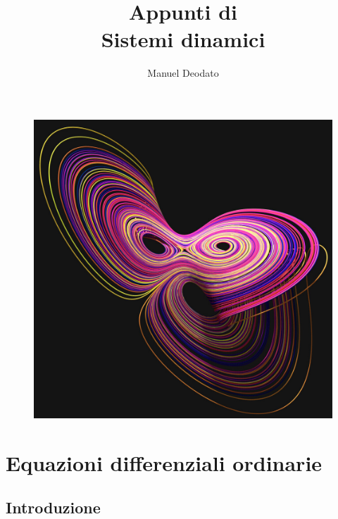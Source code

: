 \documentclass[12pt]{scrartcl}
\title{Appunti di\\ \vspace{.3cm} Sistemi dinamici}
\author{Manuel Deodato}
\date{}
\theoremstyle{style}
\renewcommand{\maketitle}{
\begin{center}
{\sffamily
{\fontsize{20}{20}\selectfont\MakeUppercase\thetitle}}

\vspace{0.2in}

{\large\scshape\theauthor}
\end{center}
}
\numberwithin{equation}{subsection}
\begin{document}
\pagestyle{plain}
\maketitle
\vspace{6cm}
\begin{figure}[h!]
	\centering
	\includegraphics[width=.6\columnwidth]{front.jpeg}
\end{figure}

\newpage
\pagestyle{plain}
\tableofcontents 
\newpage
\pagestyle{fancy}
\section{Equazioni differenziali ordinarie}
\subsection{Introduzione}
\end{document}
